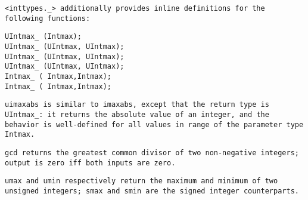 \tt{<inttypes._>} additionally provides inline
definitions for the following functions:


 \tt{UIntmax_} \tt{(Intmax);}\\

 \tt{UIntmax_} \s\tt{(UIntmax, UIntmax);}\\

 \tt{UIntmax_} \tt{(UIntmax, UIntmax);}\\

 \tt{UIntmax_} \tt{(UIntmax, UIntmax);}\\

\s\tt{Intmax_} \tt{( Intmax,}\s\s\tt{Intmax);}\\

\s\tt{Intmax_} \tt{( Intmax,}\s\s\tt{Intmax);}\\

\elbat

\tt{uimaxabs} is similar to \tt{imaxabs}, except that the return type is
\tt{UIntmax_}: it returns the absolute value of an integer, and the behavior
is well-defined for all values in range of the parameter type \tt{Intmax}.

\tt{gcd} returns the greatest common divisor of two non-negative integers;
output is zero iff both inputs are zero.

\tt{umax} and \tt{umin} respectively return the maximum and minimum of two
unsigned integers; \tt{smax} and \tt{smin} are the signed integer counterparts.
